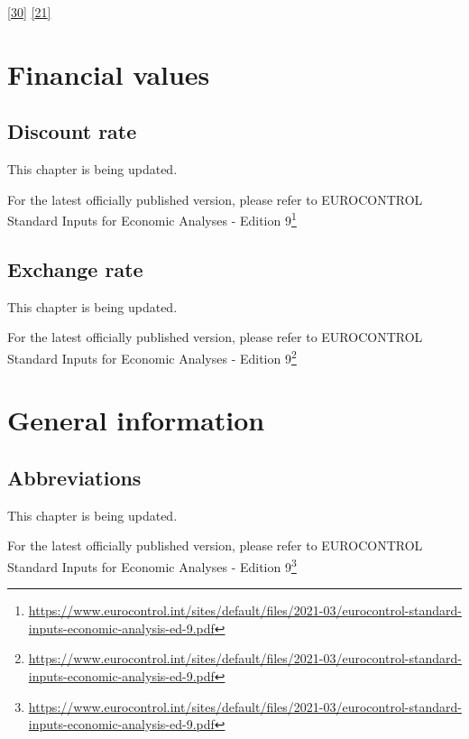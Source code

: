 \documentclass[
  11pt,
  a4paper,
]{book}
\DeclareRobustCommand{\href}[2]{#2\footnote{\url{#1}}}
\begin{document}
\protect\hyperlink{ref-ecdgregio2014}{{[}30{]}}
\protect\hyperlink{ref-ecdgmove2019}{{[}21{]}}

\part{Financial values}

\hypertarget{sec-discount-rate}{%
\chapter{Discount rate}\label{sec-discount-rate}}

This chapter is being updated.

For the latest officially published version, please refer to
\href{https://www.eurocontrol.int/sites/default/files/2021-03/eurocontrol-standard-inputs-economic-analysis-ed-9.pdf}{EUROCONTROL
Standard Inputs for Economic Analyses - Edition 9}

\hypertarget{sec-exchange-rate}{%
\chapter{Exchange rate}\label{sec-exchange-rate}}

This chapter is being updated.

For the latest officially published version, please refer to
\href{https://www.eurocontrol.int/sites/default/files/2021-03/eurocontrol-standard-inputs-economic-analysis-ed-9.pdf}{EUROCONTROL
Standard Inputs for Economic Analyses - Edition 9}

\part{General information}

\hypertarget{abbreviations}{%
\chapter*{Abbreviations}\label{abbreviations}}


This chapter is being updated.

For the latest officially published version, please refer to
\href{https://www.eurocontrol.int/sites/default/files/2021-03/eurocontrol-standard-inputs-economic-analysis-ed-9.pdf}{EUROCONTROL
Standard Inputs for Economic Analyses - Edition 9}
\end{document}
